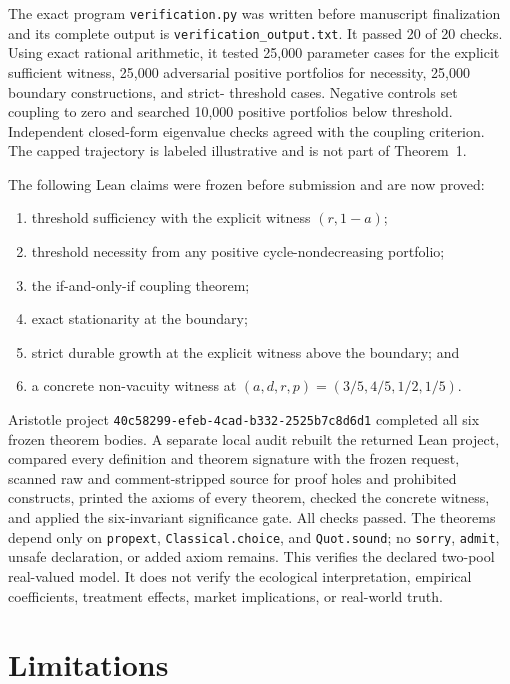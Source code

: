 \documentclass[10pt]{article}
\begin{document}
The exact program \texttt{verification.py} was written before manuscript
finalization and its complete output is \texttt{verification\_output.txt}.  It
passed 20 of 20 checks.  Using exact rational arithmetic, it tested 25,000
parameter cases for the explicit sufficient witness, 25,000 adversarial
positive portfolios for necessity, 25,000 boundary constructions, and strict-
threshold cases.  Negative controls set coupling to zero and searched 10,000
positive portfolios below threshold.  Independent closed-form eigenvalue checks
agreed with the coupling criterion.  The capped trajectory is labeled
illustrative and is not part of Theorem~1.

The following Lean claims were frozen before submission and are now proved:

\begin{enumerate}
\item threshold sufficiency with the explicit witness $(r,1-a)$;
\item threshold necessity from any positive cycle-nondecreasing portfolio;
\item the if-and-only-if coupling theorem;
\item exact stationarity at the boundary;
\item strict durable growth at the explicit witness above the boundary; and
\item a concrete non-vacuity witness at
$(a,d,r,p)=(3/5,4/5,1/2,1/5)$.
\end{enumerate}

Aristotle project \texttt{40c58299-efeb-4cad-b332-2525b7c8d6d1} completed all
six frozen theorem bodies.  A separate local audit rebuilt the returned Lean
project, compared every definition and theorem signature with the frozen
request, scanned raw and comment-stripped source for proof holes and prohibited
constructs, printed the axioms of every theorem, checked the concrete witness,
and applied the six-invariant significance gate.  All checks passed.  The
theorems depend only on \texttt{propext}, \texttt{Classical.choice}, and
\texttt{Quot.sound}; no \texttt{sorry}, \texttt{admit}, unsafe declaration, or
added axiom remains.  This verifies the declared two-pool real-valued model.
It does not verify the ecological interpretation, empirical coefficients,
treatment effects, market implications, or real-world truth.

\section{Limitations}
\end{document}
